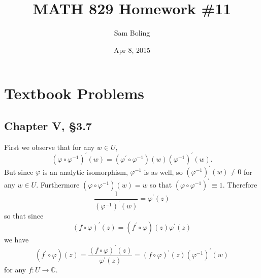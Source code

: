 \documentclass{article}
\title{MATH 829 Homework \#11}
\date{Apr 8, 2015}
\author{Sam Boling}
\newcounter{Problem}
\begin{document}
\begin{titlepage}
\maketitle
\end{titlepage}

\section{Textbook Problems}
\subsection*{Chapter V, \S 3.7}
First we observe that for any $w \in U$,
$$
  (\varphi \circ \varphi^{-1})^\prime(w)
= (\varphi^\prime \circ \varphi^{-1})(w)
  (\varphi^{-1})^\prime(w).
$$
But since $\varphi$ is an analytic isomorphism,
$\varphi^{-1}$ is as well, so
$(\varphi^{-1})^\prime(w) \neq 0$ for any $w \in U$.
Furthermore
$(\varphi \circ \varphi^{-1})(w) = w$ so that
$(\varphi \circ \varphi^{-1})^\prime \equiv 1$.
Therefore
$$
  \frac{1}
       {(\varphi^{-1})^\prime(w)}
= \varphi^\prime(z)
$$
so that since
$$
  (f \circ \varphi)^\prime(z)
= (f^\prime \circ \varphi)(z)
  \varphi^\prime(z)
$$
we have
$$
  (f^\prime \circ \varphi)(z)
= \frac{(f \circ \varphi)^\prime(z)}
       {\varphi^\prime(z)}
= (f \circ \varphi)^\prime(z)
  (\varphi^{-1})^\prime(w)
$$
for any $f : U \to \mathbb{C}$.
\end{document}
